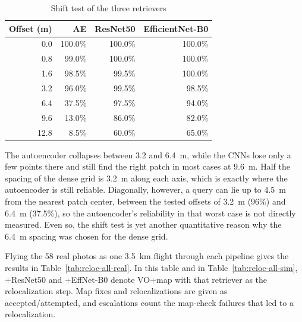 \documentclass[english, Lau, oneside]{sapthesis}%
\begin{document}
\begin{table}[!htbp]
  \centering
  \caption{Shift test of the three retrievers}
  \label{tab:shift-retrievers}
  \small
  \begin{tabular}{rrrr}
    \toprule
    Offset (m) & AE & ResNet50 & EfficientNet-B0 \\
    \midrule
    0.0 & 100.0\% & 100.0\% & 100.0\% \\
    0.8 & 99.0\% & 100.0\% & 100.0\% \\
    1.6 & 98.5\% & 99.5\% & 100.0\% \\
    3.2 & 96.0\% & 99.5\% & 98.5\% \\
    6.4 & 37.5\% & 97.5\% & 94.0\% \\
    9.6 & 13.0\% & 86.0\% & 82.0\% \\
    12.8 & 8.5\% & 60.0\% & 65.0\% \\
    \bottomrule
  \end{tabular}
\end{table}

The autoencoder collapses between 3.2 and 6.4~m, while the CNNs lose only a few points there and still find the right patch in most cases at 9.6~m. Half the spacing of the dense grid is 3.2~m along each axis, which is exactly where the autoencoder is still reliable. Diagonally, however, a query can lie up to 4.5~m from the nearest patch center, between the tested offsets of 3.2~m (96\%) and 6.4~m (37.5\%), so the autoencoder's reliability in that worst case is not directly measured. Even so, the shift test is yet another quantitative reason why the 6.4~m spacing was chosen for the dense grid.

Flying the 58 real photos as one 3.5~km flight through each pipeline gives the results in Table~\ref{tab:reloc-all-real}. In this table and in Table~\ref{tab:reloc-all-sim}, +ResNet50 and +EffNet-B0 denote VO+map with that retriever as the relocalization step. Map fixes and relocalizations are given as accepted/attempted, and escalations count the map-check failures that led to a relocalization.
\end{document}
